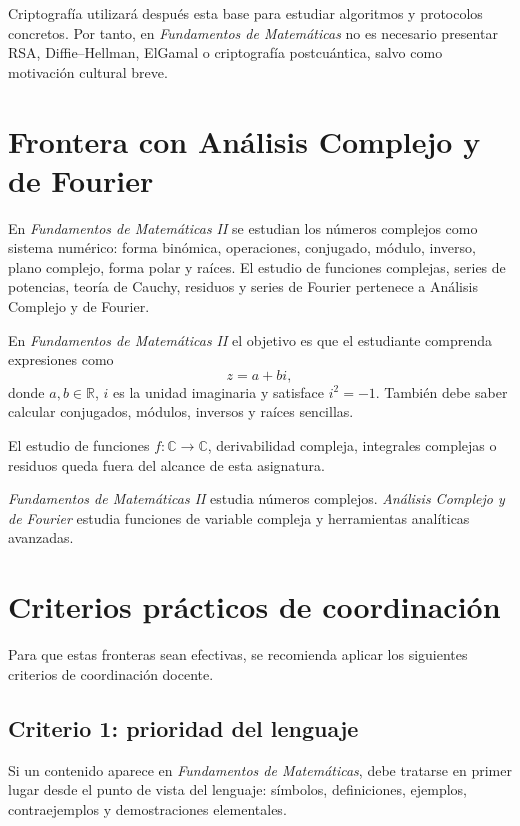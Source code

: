 Criptografía utilizará después esta base para estudiar algoritmos y protocolos concretos. Por tanto, en \emph{Fundamentos de Matemáticas} no es necesario presentar RSA, Diffie--Hellman, ElGamal o criptografía postcuántica, salvo como motivación cultural breve.

\section{Frontera con Análisis Complejo y de Fourier}

\begin{convencion}
En \emph{Fundamentos de Matemáticas II} se estudian los números complejos como sistema numérico: forma binómica, operaciones, conjugado, módulo, inverso, plano complejo, forma polar y raíces. El estudio de funciones complejas, series de potencias, teoría de Cauchy, residuos y series de Fourier pertenece a Análisis Complejo y de Fourier.
\end{convencion}

En \emph{Fundamentos de Matemáticas II} el objetivo es que el estudiante comprenda expresiones como
\[
  z=a+bi,
\]
donde \(a,b\in\mathbb{R}\), \(i\) es la unidad imaginaria y satisface \(i^2=-1\). También debe saber calcular conjugados, módulos, inversos y raíces sencillas.

El estudio de funciones \(f:\mathbb{C}\to\mathbb{C}\), derivabilidad compleja, integrales complejas o residuos queda fuera del alcance de esta asignatura.

\begin{advertencia}
\emph{Fundamentos de Matemáticas II} estudia números complejos. \emph{Análisis Complejo y de Fourier} estudia funciones de variable compleja y herramientas analíticas avanzadas.
\end{advertencia}

\section{Criterios prácticos de coordinación}

Para que estas fronteras sean efectivas, se recomienda aplicar los siguientes criterios de coordinación docente.

\subsection*{Criterio 1: prioridad del lenguaje}

Si un contenido aparece en \emph{Fundamentos de Matemáticas}, debe tratarse en primer lugar desde el punto de vista del lenguaje: símbolos, definiciones, ejemplos, contraejemplos y demostraciones elementales.

